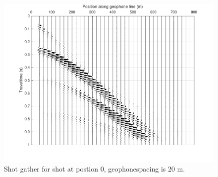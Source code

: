 \pagebreak
\begin{figure}
\includegraphics*[width=\linewidth]{Figures/Seismics/ShotGather_smallgain.pdf}
\caption{Shot gather for shot at postion 0, geophonespacing is 20 m.}
\end{figure}

